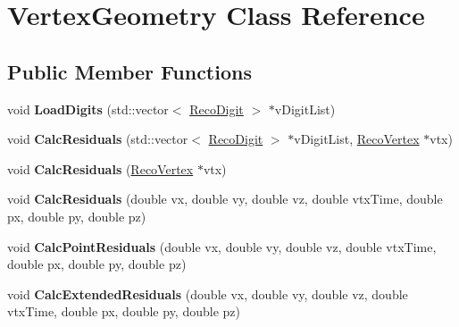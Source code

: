 \hypertarget{classVertexGeometry}{\section{Vertex\-Geometry Class Reference}
\label{classVertexGeometry}
}
\subsection*{Public Member Functions}
\begin{DoxyCompactItemize}
\item 
\hypertarget{classVertexGeometry_a391ed2f068240d590c3321f5c77b8bee}{void {\bfseries Load\-Digits} (std\-::vector$<$ \hyperlink{classRecoDigit}{Reco\-Digit} $>$ $\ast$v\-Digit\-List)}\label{classVertexGeometry_a391ed2f068240d590c3321f5c77b8bee}

\item 
\hypertarget{classVertexGeometry_a779040e04233beb0ab86402d09ffdda5}{void {\bfseries Calc\-Residuals} (std\-::vector$<$ \hyperlink{classRecoDigit}{Reco\-Digit} $>$ $\ast$v\-Digit\-List, \hyperlink{classRecoVertex}{Reco\-Vertex} $\ast$vtx)}\label{classVertexGeometry_a779040e04233beb0ab86402d09ffdda5}

\item 
\hypertarget{classVertexGeometry_a89a99bae6f82d90c70b38969af7dad72}{void {\bfseries Calc\-Residuals} (\hyperlink{classRecoVertex}{Reco\-Vertex} $\ast$vtx)}\label{classVertexGeometry_a89a99bae6f82d90c70b38969af7dad72}

\item 
\hypertarget{classVertexGeometry_a9ac9b864c0c265f7f668e07ba0772162}{void {\bfseries Calc\-Residuals} (double vx, double vy, double vz, double vtx\-Time, double px, double py, double pz)}\label{classVertexGeometry_a9ac9b864c0c265f7f668e07ba0772162}

\item 
\hypertarget{classVertexGeometry_ac74f342b88fe5ffb546f93795365cbcb}{void {\bfseries Calc\-Point\-Residuals} (double vx, double vy, double vz, double vtx\-Time, double px, double py, double pz)}\label{classVertexGeometry_ac74f342b88fe5ffb546f93795365cbcb}

\item 
\hypertarget{classVertexGeometry_ac32d693630972a588b1aef9efb0709ca}{void {\bfseries Calc\-Extended\-Residuals} (double vx, double vy, double vz, double vtx\-Time, double px, double py, double pz)}\label{classVertexGeometry_ac32d693630972a588b1aef9efb0709ca}


\end{DoxyCompactItemize}
